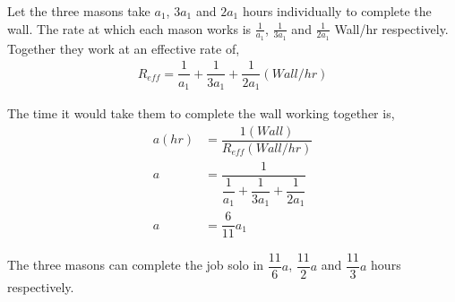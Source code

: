 \begin{solution}
  Let the three masons take $a_1$, $3a_1$ and $2a_1$ hours individually to complete the wall. The rate at which each mason works is $\frac{1}{a_1}$, $\frac{1}{3a_1}$ and $\frac{1}{2a_1}$ Wall/hr respectively. Together they work at an effective rate of,
  \begin{align}
	R_{eff} = \dfrac{1}{a_1} + \dfrac{1}{3a_1} + \dfrac{1}{2a_1} (Wall/hr)
  \end{align}
  
  The time it would take them to complete the wall working together is,
  \begin{align}
    a(hr) &= \dfrac{1(Wall)}{R_{eff}(Wall/hr)} \\
    a     &= \dfrac{1}{\dfrac{1}{a_1} + \dfrac{1}{3a_1} + \dfrac{1}{2a_1}} \\
    a     &= \dfrac{6}{11}a_1
  \end{align}
  
  The three masons can complete the job solo in $\dfrac{11}{6}a$, $\dfrac{11}{2}a$ and $\dfrac{11}{3}a$ hours respectively.
  
\end{solution}

